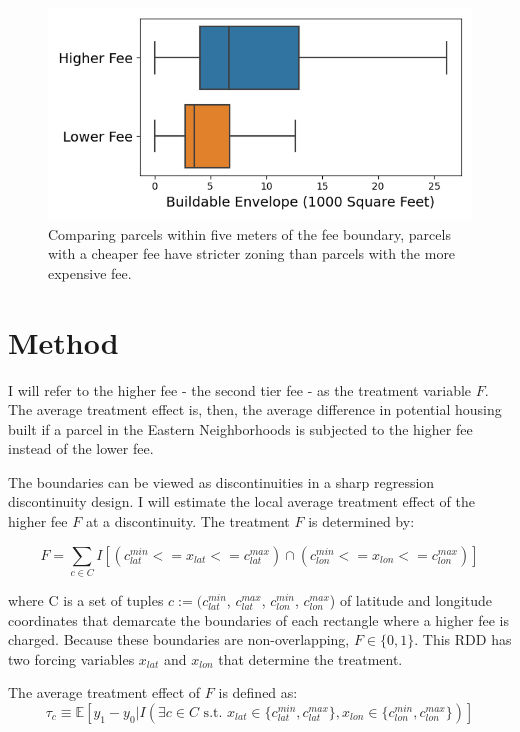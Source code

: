 \documentclass[a4paper,12pt]{article}
\begin{document}
\begin{figure}[hbt]
    \centering
    \includegraphics[scale=.7]{figures/Envelope_boundary.png}
    \caption{Comparing parcels within five meters of the fee boundary, parcels with a cheaper fee have stricter zoning than parcels with the more expensive fee.}
    \label{fig:Envelope_boundary}
\end{figure}


\section{Method}

I will refer to the higher fee - the second tier fee - as the treatment variable $F$. The average treatment effect is, then, the average difference in potential housing built if a parcel in the Eastern Neighborhoods is subjected to the higher fee instead of the lower fee.

The boundaries can be viewed as discontinuities in a sharp regression discontinuity design. I will estimate the local average treatment effect of the higher fee $F$ at a discontinuity. The treatment $F$ is determined by:

\begin{equation}
F = \sum_{c \in C} I[(c^{min}_{lat} <= x_{lat} <= c^{max}_{lat}) \cap (c^{min}_{lon} <= x_{lon} <= c^{max}_{lon})]
\end{equation}

where C is a set of tuples $c:=(c^{min}_{lat}$, $c^{max}_{lat}$, $c^{min}_{lon} $, $c^{max}_{lon}$) of latitude and longitude coordinates that demarcate the boundaries of each rectangle where a higher fee is charged. Because these boundaries are non-overlapping, $F \in \{0, 1\}$. This RDD has two forcing variables $x_{lat}$ and $x_{lon}$ that determine the treatment.

The average treatment effect of $F$ is defined as:
\begin{equation}
\tau_{c} \equiv \mathbb{E}[y_{1} - y_{0} \bigg| I(\exists c \in C \text{ s.t. } x_{lat} \in \{c^{min}_{lat}, c^{max}_{lat}\}, x_{lon} \in \{c^{min}_{lon}, c^{max}_{lon}\}) ]
\end{equation}
\end{document}
